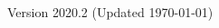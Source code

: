 \documentclass{beamer}
\subtitle[Statistical Inference]{Topic 03 - Statistical Inference}
\date{May 15th, 2020}
\begin{document}
\begin{CJK}{UTF8}{ipxm}

\begin{frame}
  \maketitle

  \vfill

  \hfill \tiny{Version 2020.2 (Updated \today)}
\end{frame}






\end{CJK}
\end{document}
